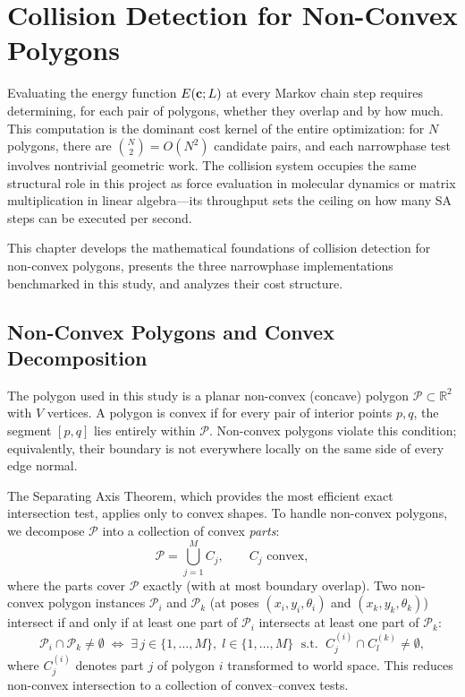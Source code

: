 \chapter{Collision Detection for Non-Convex Polygons}

Evaluating the energy function $E(\mathbf{c}; L)$ at every Markov chain step
requires determining, for each pair of polygons, whether they overlap
and by how much.
This computation is the dominant cost kernel of the entire optimization:
for $N$ polygons, there are $\binom{N}{2} = O(N^2)$ candidate pairs,
and each narrowphase test involves nontrivial geometric work.
The collision system occupies the same structural role in this project
as force evaluation in molecular dynamics or matrix multiplication in
linear algebra—its throughput sets the ceiling on how many SA steps
can be executed per second.

This chapter develops the mathematical foundations of collision detection
for non-convex polygons, presents the three narrowphase implementations
benchmarked in this study, and analyzes their cost structure.

\section{Non-Convex Polygons and Convex Decomposition}

The polygon used in this study is a planar non-convex (concave) polygon
$\mathcal{P} \subset \mathbb{R}^2$ with $V$ vertices.
A polygon is convex if for every pair of interior points $p, q$,
the segment $[p, q]$ lies entirely within $\mathcal{P}$.
Non-convex polygons violate this condition; equivalently, their
boundary is not everywhere locally on the same side of every edge
normal.

The Separating Axis Theorem, which provides the most efficient exact
intersection test, applies only to convex shapes.
To handle non-convex polygons, we decompose $\mathcal{P}$ into a
collection of convex \emph{parts}:
\[
  \mathcal{P} = \bigcup_{j=1}^{M} C_j, \qquad
  C_j \text{ convex},
\]
where the parts cover $\mathcal{P}$ exactly (with at most boundary overlap).
Two non-convex polygon instances $\mathcal{P}_i$ and $\mathcal{P}_k$
(at poses $(x_i, y_i, \theta_i)$ and $(x_k, y_k, \theta_k)$) intersect
if and only if at least one part of $\mathcal{P}_i$ intersects at least
one part of $\mathcal{P}_k$:
\[
  \mathcal{P}_i \cap \mathcal{P}_k \neq \emptyset
  \;\iff\;
  \exists\, j \in \{1,\dots,M\},\; l \in \{1,\dots,M\}
  \;\text{ s.t. }\;
  C_j^{(i)} \cap C_l^{(k)} \neq \emptyset,
\]
where $C_j^{(i)}$ denotes part $j$ of polygon $i$ transformed to
world space. This reduces non-convex intersection to a collection of
convex--convex tests.

